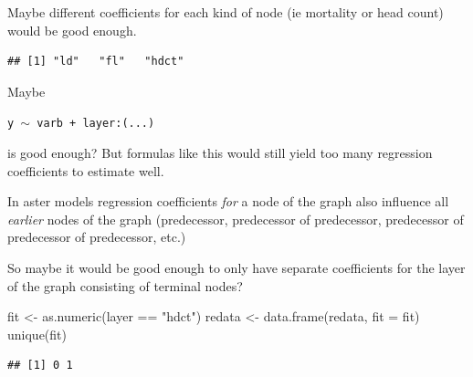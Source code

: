 \documentclass[
  ignorenonframetext,
]{beamer}
\newenvironment{Shaded}{\begin{snugshade}}{\end{snugshade}}
\newcommand{\AttributeTok}[1]{\textcolor[rgb]{0.77,0.63,0.00}{#1}}
\newcommand{\FunctionTok}[1]{\textcolor[rgb]{0.00,0.00,0.00}{#1}}
\newcommand{\NormalTok}[1]{#1}
\newcommand{\OtherTok}[1]{\textcolor[rgb]{0.56,0.35,0.01}{#1}}
\newcommand{\SpecialCharTok}[1]{\textcolor[rgb]{0.00,0.00,0.00}{#1}}
\newcommand{\StringTok}[1]{\textcolor[rgb]{0.31,0.60,0.02}{#1}}
\begin{document}
\begin{frame}[fragile]{}
\protect\hypertarget{section-16}{}
Maybe different coefficients for each kind of node (ie mortality or head
count) would be good enough.

\vspace{12pt}
\tiny

\begin{Shaded}
\end{Shaded}

\begin{verbatim}
## [1] "ld"   "fl"   "hdct"
\end{verbatim}

\vspace{12pt}
\normalsize

Maybe

\begin{center}
  \texttt{y $\sim$ varb + layer:(...)}
\end{center}

is good enough? But formulas like this would still yield too many
regression coefficients to estimate well.
\end{frame}

\begin{frame}[fragile]{}
\protect\hypertarget{section-17}{}
In aster models regression coefficients \emph{for} a node of the graph
also influence all \emph{earlier} nodes of the graph (predecessor,
predecessor of predecessor, predecessor of predecessor of predecessor,
etc.)

So maybe it would be good enough to only have separate coefficients for
the layer of the graph consisting of terminal nodes?

\vspace{12pt}

\begin{Shaded}
\begin{Highlighting}[]
\NormalTok{fit }\OtherTok{\textless{}{-}} \FunctionTok{as.numeric}\NormalTok{(layer }\SpecialCharTok{==} \StringTok{"hdct"}\NormalTok{) }
\NormalTok{redata }\OtherTok{\textless{}{-}} \FunctionTok{data.frame}\NormalTok{(redata, }\AttributeTok{fit =}\NormalTok{ fit)}
\FunctionTok{unique}\NormalTok{(fit)}
\end{Highlighting}
\end{Shaded}

\begin{verbatim}
## [1] 0 1
\end{verbatim}
\end{frame}
\end{document}
